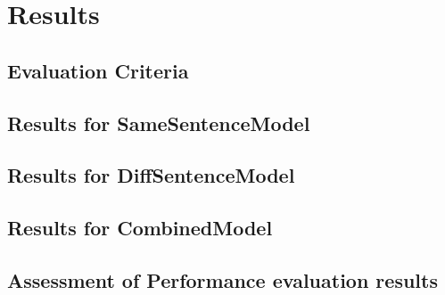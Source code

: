 \chapter{Results}\label{chapter:results}

\section{Evaluation Criteria}


\section{Results for SameSentenceModel}

\section{Results for DiffSentenceModel}

\section{Results for CombinedModel}

\section{Assessment of Performance evaluation results}

